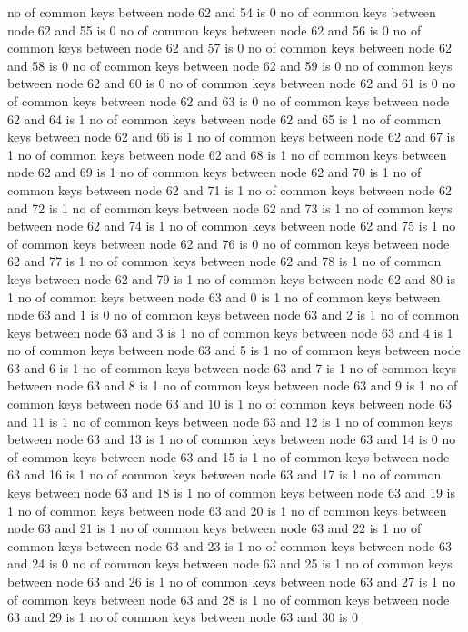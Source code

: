 no of common keys between node 62 and 54 is 0
no of common keys between node 62 and 55 is 0
no of common keys between node 62 and 56 is 0
no of common keys between node 62 and 57 is 0
no of common keys between node 62 and 58 is 0
no of common keys between node 62 and 59 is 0
no of common keys between node 62 and 60 is 0
no of common keys between node 62 and 61 is 0
no of common keys between node 62 and 63 is 0
no of common keys between node 62 and 64 is 1
no of common keys between node 62 and 65 is 1
no of common keys between node 62 and 66 is 1
no of common keys between node 62 and 67 is 1
no of common keys between node 62 and 68 is 1
no of common keys between node 62 and 69 is 1
no of common keys between node 62 and 70 is 1
no of common keys between node 62 and 71 is 1
no of common keys between node 62 and 72 is 1
no of common keys between node 62 and 73 is 1
no of common keys between node 62 and 74 is 1
no of common keys between node 62 and 75 is 1
no of common keys between node 62 and 76 is 0
no of common keys between node 62 and 77 is 1
no of common keys between node 62 and 78 is 1
no of common keys between node 62 and 79 is 1
no of common keys between node 62 and 80 is 1
no of common keys between node 63 and 0 is 1
no of common keys between node 63 and 1 is 0
no of common keys between node 63 and 2 is 1
no of common keys between node 63 and 3 is 1
no of common keys between node 63 and 4 is 1
no of common keys between node 63 and 5 is 1
no of common keys between node 63 and 6 is 1
no of common keys between node 63 and 7 is 1
no of common keys between node 63 and 8 is 1
no of common keys between node 63 and 9 is 1
no of common keys between node 63 and 10 is 1
no of common keys between node 63 and 11 is 1
no of common keys between node 63 and 12 is 1
no of common keys between node 63 and 13 is 1
no of common keys between node 63 and 14 is 0
no of common keys between node 63 and 15 is 1
no of common keys between node 63 and 16 is 1
no of common keys between node 63 and 17 is 1
no of common keys between node 63 and 18 is 1
no of common keys between node 63 and 19 is 1
no of common keys between node 63 and 20 is 1
no of common keys between node 63 and 21 is 1
no of common keys between node 63 and 22 is 1
no of common keys between node 63 and 23 is 1
no of common keys between node 63 and 24 is 0
no of common keys between node 63 and 25 is 1
no of common keys between node 63 and 26 is 1
no of common keys between node 63 and 27 is 1
no of common keys between node 63 and 28 is 1
no of common keys between node 63 and 29 is 1
no of common keys between node 63 and 30 is 0
